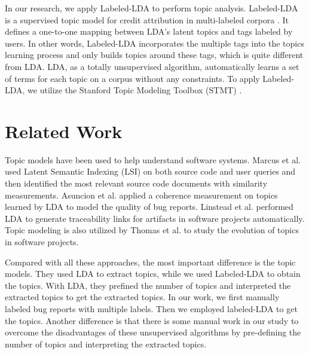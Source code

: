 \documentclass[10pt, conference, compsocconf]{IEEEtran}
\begin{document}
In our research, we apply Labeled-LDA to perform topic analysis. Labeled-LDA is a supervised topic model for credit attribution in multi-labeled corpora \cite{labeledlda}. It defines a one-to-one mapping between LDA’s latent topics and tags labeled by users. In other words, Labeled-LDA incorporates the multiple tags into the topics learning process and only builds topics around these tags, which is quite different from LDA. LDA, as a totally unsupervised algorithm, automatically learns a set of terms for each topic on a corpus without any constraints. To apply Labeled-LDA, we utilize the Stanford Topic Modeling Toolbox (STMT) \cite{stmt}. 




\section{Related Work}
\label{sec:relatedwork}
Topic models have been used to help understand software systems. Marcus et al.\cite{Marcus04aninformation} used Latent Semantic Indexing (LSI) on both source code and user queries and then identified the most relevant source code documents with similarity measurements. Asuncion et al.\cite{Asuncion:2010} applied a coherence measurement on topics learned by LDA to model the quality of bug reports. Linstead et al.\cite{Linstead:2009} performed LDA to generate traceability links for artifacts in software projects automatically. Topic modeling is also utilized by Thomas et al.\cite{Thomas:2011} to study the evolution of topics in software projects.

Compared with all these approaches, the most important difference is the topic models. They used LDA to extract topics, while we used Labeled-LDA to obtain the topics. With LDA, they prefined the number of topics and interpreted the extracted topics to get the extracted topics\cite{Asuncion:2010}. In our work, we first manually labeled bug reports with multiple labels. Then we employed labeled-LDA to get the topics. Another difference is that there is some manual work in our study to overcome the disadvantages of these unsupervised algorithms by pre-defining the number of topics and interpreting the extracted topics. 
\end{document}
